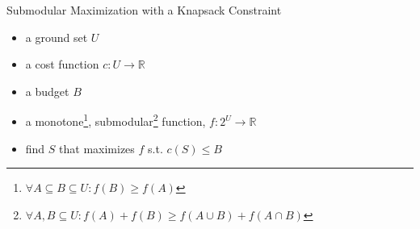 \begin{frame}{Submodular Maximization with a Knapsack Constraint}
    \begin{itemize}
        \item a ground set $U$
        \item a cost function $c:U \to \mathbb{R}$
        \item a budget $B$
        \item a monotone\footnote{
                $\forall A \subseteq B \subseteq U: f(B) \geq f(A)$
            }, submodular\footnote{
                $\forall A, B \subseteq U: f(A) + f(B) \geq f(A \cup B) + f(A \cap B)$
            } function, $f:2^U \to \mathbb{R}$
        \item find $S$ that maximizes $f$ s.t. $c(S) \leq B$
    \end{itemize}
\end{frame}

